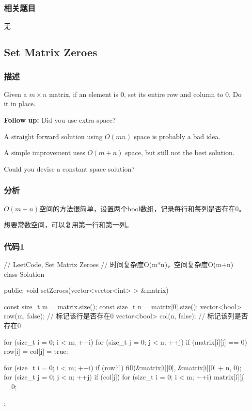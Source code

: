 \subsubsection{相关题目}
\begindot
\item 无
\myenddot


\subsection{Set Matrix Zeroes} %
\label{sec:set-matrix-zeroes}


\subsubsection{描述}
Given a $m \times n$ matrix, if an element is 0, set its entire row and column 
to 0. Do it in place.

\textbf{Follow up:}
Did you use extra space?

A straight forward solution using $O(mn)$ space is probably a bad idea.

A simple improvement uses $O(m + n)$ space, but still not the best solution.

Could you devise a constant space solution?


\subsubsection{分析}
$O(m+n)$空间的方法很简单，设置两个bool数组，记录每行和每列是否存在0。

想要常数空间，可以复用第一行和第一列。


\subsubsection{代码1}
\begin{Code}
	// LeetCode, Set Matrix Zeroes
	// 时间复杂度O(m*n)，空间复杂度O(m+n)
	class Solution {
		public:
		void setZeroes(vector<vector<int> > &matrix) {
			const size_t m = matrix.size();
			const size_t n = matrix[0].size();
			vector<bool> row(m, false); // 标记该行是否存在0
			vector<bool> col(n, false); // 标记该列是否存在0
			
			for (size_t i = 0; i < m; ++i) {
				for (size_t j = 0; j < n; ++j) {
					if (matrix[i][j] == 0) {
						row[i] = col[j] = true;
					}
				}
			}
			
			for (size_t i = 0; i < m; ++i) {
				if (row[i])
				fill(&matrix[i][0], &matrix[i][0] + n, 0);
			}
			for (size_t j = 0; j < n; ++j) {
				if (col[j]) {
					for (size_t i = 0; i < m; ++i) {
						matrix[i][j] = 0;
					}
				}
			}
		}
	};
\end{Code}


